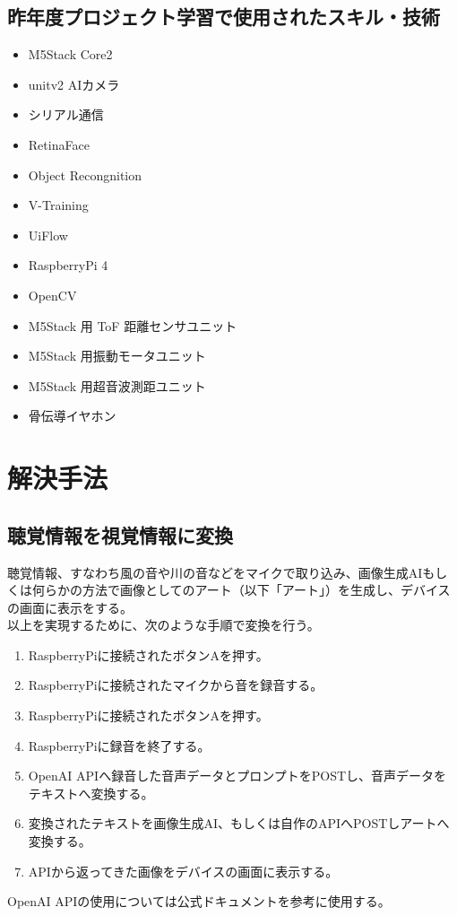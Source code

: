 \documentclass[12pt,a4paper]{report}
\begin{document}
\subsection{昨年度プロジェクト学習で使用されたスキル・技術}
\noindent\space
\begin{itemize}
  \item M5Stack Core2
  \item unitv2 AIカメラ
  \item シリアル通信
  \item RetinaFace
  \item Object Recongnition
  \item V-Training
  \item UiFlow
  \item RaspberryPi 4
  \item OpenCV
  \item M5Stack 用 ToF 距離センサユニット
  \item M5Stack 用振動モータユニット
  \item M5Stack 用超音波測距ユニット
  \item 骨伝導イヤホン
\end{itemize}

\section{解決手法}
\subsection{聴覚情報を視覚情報に変換}
\noindent\space
聴覚情報、すなわち風の音や川の音などをマイクで取り込み、画像生成AIもしくは何らかの方法で画像としてのアート（以下「アート」）を生成し、デバイスの画面に表示をする。\\
以上を実現するために、次のような手順で変換を行う。
\begin{enumerate}
  \item RaspberryPiに接続されたボタンAを押す。
  \item RaspberryPiに接続されたマイクから音を録音する。
  \item RaspberryPiに接続されたボタンAを押す。
  \item RaspberryPiに録音を終了する。
  \item OpenAI APIへ録音した音声データとプロンプトをPOSTし、音声データをテキストへ変換する。
  \item 変換されたテキストを画像生成AI、もしくは自作のAPIへPOSTしアートへ変換する。
  \item APIから返ってきた画像をデバイスの画面に表示する。
\end{enumerate}
OpenAI APIの使用については公式ドキュメント\cite{OpenAIAPI}を参考に使用する。
\end{document}
